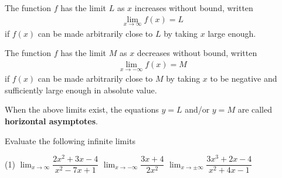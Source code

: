 \documentclass[../mathNotesPreamble]{subfiles}
\begin{document}
  \begin{thmBox*}
    The function $f$ has the limit $L$ as $x$ increases without bound, written
    \begin{align*}
      \lim_{x\to \infty} f(x)=L
    \end{align*}
    if $f(x)$ can be made arbitrarily close to $L$ by taking $x$ large enough.
    
    The function $f$ has the limit $M$ as $x$ decreases without bound, written
    \begin{align*}
      \lim_{x\to -\infty} f(x)=M
    \end{align*}
    if $f(x)$ can be made arbitrarily close to $M$ by taking $x$ to be negative and sufficiently large enough in absolute value.
    
    When the above limits exist, the equations $y=L$ and/or $y=M$ are called \textbf{horizontal asymptotes}.
  \end{thmBox*}
  \begin{ex*}
    Evaluate the following infinite limits
  \end{ex*}
  \begin{extasks}[after-item-skip=\stretch{1}](1)
    \task $\displaystyle \lim_{x\to \infty} \dfrac{2x^2+3x-4}{x^2-7x+1}$
    \task $\displaystyle \lim_{x\to -\infty} \dfrac{3x+4}{2x^2}$
    \task $\displaystyle \lim_{x\to \pm\infty} \dfrac{3x^3+2x-4}{x^2+4x-1}$
  \end{extasks}
  \pagebreak
  
\end{document}
